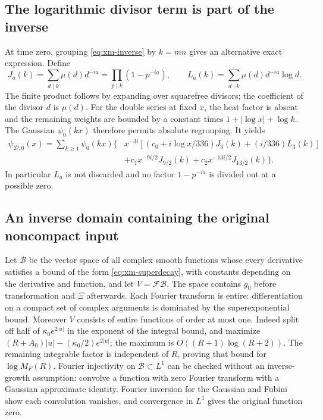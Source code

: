 \subsection{The logarithmic divisor term is part of the inverse}

At time zero, grouping \eqref{eq:xm-inverse} by $k=mn$ gives an
alternative exact expression. Define
\[
 J_a(k)=\sum_{d\mid k}\mu(d)d^{-ia}
       =\prod_{p\mid k}(1-p^{-ia}),\qquad
 L_a(k)=\sum_{d\mid k}\mu(d)d^{-ia}\log d.
\]
The finite product follows by expanding over squarefree divisors;
the coefficient of the divisor $d$ is $\mu(d)$. For the double
series at fixed $x$, the heat factor is absent and the remaining
weights are bounded by a constant times $1+|\log x|+\log k$.
The Gaussian $\psi_0(kx)$ therefore permits absolute regrouping.
It yields
\begin{equation}\label{eq:xm-divisor}
\begin{split}
 \psi_{\mathcal D,0}(x)=\sum_{k\ge1}\psi_0(kx)
 \bigl\{&x^{-3i}[(c_0+i\log x/336)J_3(k)
                         +(i/336)L_3(k)]\\
       &+c_1x^{-9i/2}J_{9/2}(k)
        +c_2x^{-13i/2}J_{13/2}(k)\bigr\}.
\end{split}
\end{equation}
In particular $L_a$ is not discarded and no factor
$1-p^{-ia}$ is divided out at a possible zero.

\subsection{An inverse domain containing the original noncompact input}

Let $\mathcal B$ be the vector space of all complex smooth functions
whose every derivative satisfies a bound of the form
\eqref{eq:xm-superdecay}, with constants depending on the derivative
and function, and let $V=\mathscr F\mathcal B$.
The space contains $g_0$ before transformation and $\Xi$ afterwards.
Each Fourier transform is entire: differentiation on a compact
set of complex arguments is dominated by the superexponential
bound. Moreover $V$ consists of entire functions of order at most
one. Indeed split off half of $\kappa_0e^{2|u|}$ in the exponent of the
integral bound, and maximize
$(R+A_0)|u|-(\kappa_0/2)e^{2|u|}$; the maximum is
$O((R+1)\log(R+2))$. The remaining integrable factor is independent
of $R$, proving that bound for $\log M_F(R)$.
Fourier injectivity on $\mathcal B\subset L^1$ can be checked
without an inverse-growth assumption: convolve a function with
zero Fourier transform with a Gaussian approximate identity.
Fourier inversion for the Gaussian and Fubini show each convolution
vanishes, and convergence in $L^1$ gives the original function zero.

